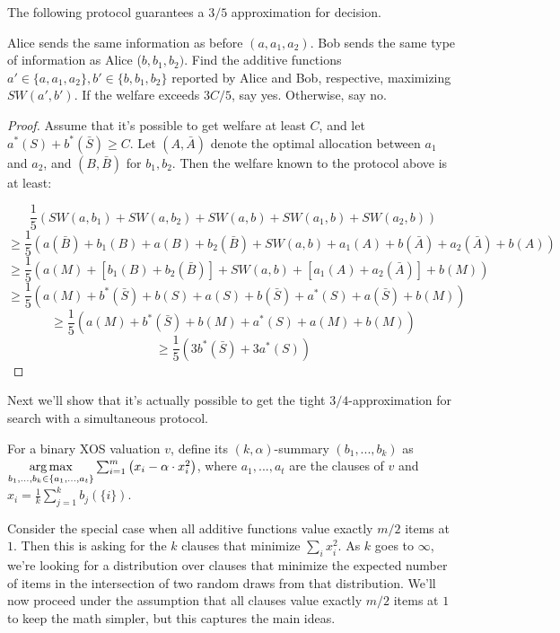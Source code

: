 \begin{proposition} The following protocol guarantees a $3/5$ approximation for decision.
\end{proposition}

Alice sends the same information as before $(a, a_1, a_2)$. Bob sends the same type of information as Alice ($b, b_1, b_2)$. Find the additive functions $a' \in \{a,a_1,a_2\}, b' \in \{b,b_1,b_2\}$ reported by Alice and Bob, respective, maximizing $SW(a', b')$. If the welfare exceeds $3C/5$, say yes. Otherwise, say no. \\

\begin{proof}
Assume that it's possible to get welfare at least $C$, and let $a^*(S) + b^*(\bar{S}) \geq C$. Let $(A,\bar{A})$ denote the optimal allocation between $a_1$ and $a_2$, and $(B,\bar{B})$ for $b_1, b_2$. Then the welfare known to the protocol above is at least:

$$\frac{1}{5} \left( SW(a, b_1) + SW(a, b_2) + SW(a, b) + SW(a_1, b) + SW(a_2, b)\right)$$
$$\geq \frac{1}{5} \left( a(\bar{B}) + b_1(B) + a(B) + b_2(\bar{B}) + SW(a, b) + a_1(A) + b(\bar{A}) + a_2(\bar{A}) + b(A)\right)$$
$$\geq \frac{1}{5} \left( a(M) + [b_1(B) + b_2(\bar{B})] + SW(a, b) + [a_1(A) + a_2(\bar{A})] + b(M)\right)$$
$$\geq \frac{1}{5} \left( a(M) + b^*(\bar{S}) + b(S) + a(S) + b(\bar{S}) + a^*(S) + a(\bar{S}) + b(M)\right)$$
$$\geq \frac{1}{5} \left( a(M) + b^*(\bar{S}) +   b(M) + a^*(S) + a(M)+ b(M)\right)$$
$$\geq \frac{1}{5} \left(3 b^*(\bar{S}) +3 a^*(S) \right)$$
\end{proof}

Next we'll show that it's actually possible to get the tight $3/4$-approximation for search with a simultaneous protocol. 

\begin{definition}
\label{def:bsketch}
For a binary XOS valuation $v$, define its $(k,\alpha)$-summary $(b_1,...,b_k)$ as $\operatorname*{arg\,max}\limits_{b_1,...,b_k \in \{a_1,...,a_t\}} \sum_{i=1}^m  \left( x_i - \alpha\cdot x_i^2 \right)$, where $a_1,...,a_t$ are the clauses of $v$ and $x_i = \frac{1}{k} \sum_{j = 1}^{k} b_j(\{i\})$. 
\end{definition}

Consider the special case when all additive functions value exactly $m/2$ items at $1$. Then this is asking for the $k$ clauses that minimize $\sum_i x_i^2$. As $k$ goes to $\infty$, we're looking for a distribution over clauses that minimize the expected number of items in the intersection of two random draws from that distribution. We'll now proceed under the assumption that all clauses value exactly $m/2$ items at $1$ to keep the math simpler, but this captures the main ideas.

